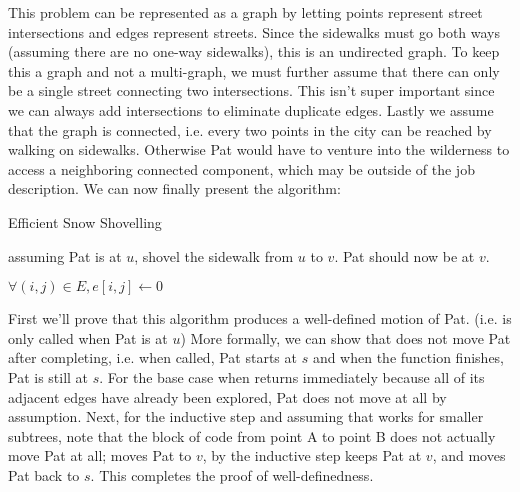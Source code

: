 \documentclass[11pt,letterpaper]{article}
\begin{document}
\begin{solution}
    This problem can be represented as a graph by letting points represent street intersections and edges represent streets. Since the sidewalks must go both ways (assuming there are no one-way sidewalks), this is an undirected graph. To keep this a graph and not a multi-graph, we must further assume that there can only be a single street connecting two intersections. This isn't super important since we can always add intersections to eliminate duplicate edges. Lastly we assume that the graph is connected, i.e. every two points in the city can be reached by walking on sidewalks. Otherwise Pat would have to venture into the wilderness to access a neighboring connected component, which may be outside of the job description. We can now finally present the algorithm:

    \begin{algorithm}
    \caption{Efficient Snow Shovelling}
    \DontPrintSemicolon

     {
        assuming Pat is at $u$, shovel the sidewalk from $u$ to $v$.\;
        Pat should now be at $v$.
    }\;

    
    $\forall (i,j)\in E, e[i,j]\leftarrow 0$ 
    \end{algorithm}

    First we'll prove that this algorithm produces a well-defined motion of Pat. (i.e.  is only called when Pat is at $u$) More formally, we can show that  does not move Pat after completing, i.e. when called, Pat starts at $s$ and when the function finishes, Pat is still at $s$. For the base case when  returns immediately because all of its adjacent edges have already been explored, Pat does not move at all by assumption. Next, for the inductive step and assuming that  works for smaller subtrees, note that the block of code from point A to point B does not actually move Pat at all;  moves Pat to $v$, by the inductive step  keeps Pat at $v$, and  moves Pat back to $s$. This completes the proof of well-definedness.   


\end{solution}
\end{document}
